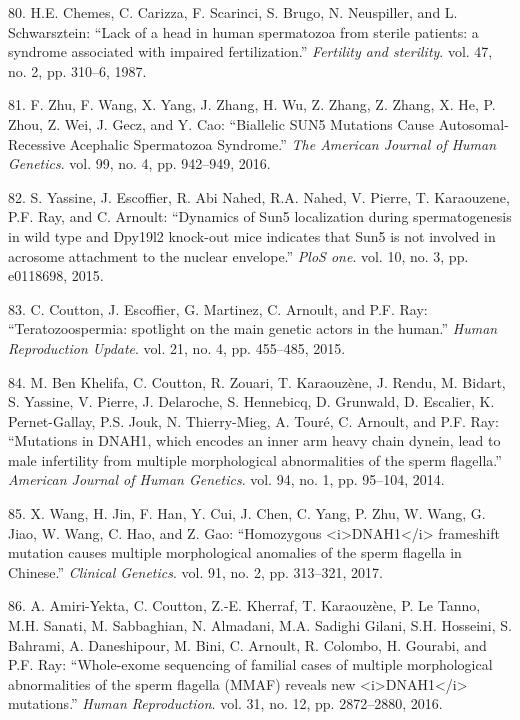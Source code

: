 \documentclass[12pt,a4paper,twoside]{ugathesis}
\theoremstyle{definition}
\theoremstyle{definition}
\theoremstyle{definition}
\theoremstyle{remark}
\begin{document}
\hypertarget{ref-Chemes1987}{}
80. H.E. Chemes, C. Carizza, F. Scarinci, S. Brugo, N. Neuspiller, and
L. Schwarsztein: ``Lack of a head in human spermatozoa from sterile
patients: a syndrome associated with impaired fertilization.''
\emph{Fertility and sterility}. vol. 47, no. 2, pp. 310--6, 1987.

\hypertarget{ref-Zhu2016}{}
81. F. Zhu, F. Wang, X. Yang, J. Zhang, H. Wu, Z. Zhang, Z. Zhang, X.
He, P. Zhou, Z. Wei, J. Gecz, and Y. Cao: ``Biallelic SUN5 Mutations
Cause Autosomal-Recessive Acephalic Spermatozoa Syndrome.'' \emph{The
American Journal of Human Genetics}. vol. 99, no. 4, pp. 942--949, 2016.

\hypertarget{ref-Yassine2015}{}
82. S. Yassine, J. Escoffier, R. Abi Nahed, R.A. Nahed, V. Pierre, T.
Karaouzene, P.F. Ray, and C. Arnoult: ``Dynamics of Sun5 localization
during spermatogenesis in wild type and Dpy19l2 knock-out mice indicates
that Sun5 is not involved in acrosome attachment to the nuclear
envelope.'' \emph{PloS one}. vol. 10, no. 3, pp. e0118698, 2015.

\hypertarget{ref-Coutton2015}{}
83. C. Coutton, J. Escoffier, G. Martinez, C. Arnoult, and P.F. Ray:
``Teratozoospermia: spotlight on the main genetic actors in the human.''
\emph{Human Reproduction Update}. vol. 21, no. 4, pp. 455--485, 2015.

\hypertarget{ref-BenKhelifa2014}{}
84. M. Ben Khelifa, C. Coutton, R. Zouari, T. Karaouzène, J. Rendu, M.
Bidart, S. Yassine, V. Pierre, J. Delaroche, S. Hennebicq, D. Grunwald,
D. Escalier, K. Pernet-Gallay, P.S. Jouk, N. Thierry-Mieg, A. Touré, C.
Arnoult, and P.F. Ray: ``Mutations in DNAH1, which encodes an inner arm
heavy chain dynein, lead to male infertility from multiple morphological
abnormalities of the sperm flagella.'' \emph{American Journal of Human
Genetics}. vol. 94, no. 1, pp. 95--104, 2014.

\hypertarget{ref-Wang2017}{}
85. X. Wang, H. Jin, F. Han, Y. Cui, J. Chen, C. Yang, P. Zhu, W. Wang,
G. Jiao, W. Wang, C. Hao, and Z. Gao: ``Homozygous
\textless{}i\textgreater{}DNAH1\textless{}/i\textgreater{} frameshift
mutation causes multiple morphological anomalies of the sperm flagella
in Chinese.'' \emph{Clinical Genetics}. vol. 91, no. 2, pp. 313--321,
2017.

\hypertarget{ref-Amiri-Yekta2016}{}
86. A. Amiri-Yekta, C. Coutton, Z.-E. Kherraf, T. Karaouzène, P. Le
Tanno, M.H. Sanati, M. Sabbaghian, N. Almadani, M.A. Sadighi Gilani,
S.H. Hosseini, S. Bahrami, A. Daneshipour, M. Bini, C. Arnoult, R.
Colombo, H. Gourabi, and P.F. Ray: ``Whole-exome sequencing of familial
cases of multiple morphological abnormalities of the sperm flagella
(MMAF) reveals new
\textless{}i\textgreater{}DNAH1\textless{}/i\textgreater{} mutations.''
\emph{Human Reproduction}. vol. 31, no. 12, pp. 2872--2880, 2016.
\end{document}
